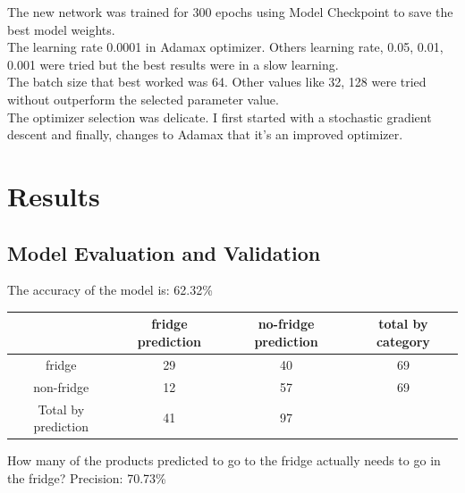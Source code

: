 \documentclass[a4paper,10pt]{article}
\begin{document}

The new network was trained for 300 epochs using Model Checkpoint to save the best model weights. \\

The learning rate 0.0001 in Adamax optimizer. Others learning rate, 0.05, 0.01, 0.001 were tried but the best results were in a slow learning. \\

The batch size that best worked was 64. Other values like 32, 128 were tried without outperform the selected parameter value.\\

The optimizer selection was delicate. I first started with a stochastic gradient descent and finally, changes to Adamax that it's an improved optimizer. \\

\section{Results}

\subsection{Model Evaluation and Validation}


The accuracy of the model is: 62.32\%

\begin{center}
\begin{tabular}{ |c|c|c|c| } 
 \hline
       & fridge prediction & no-fridge prediction & total by category \\ 
 \hline
 fridge & 29 & 40 & 69 \\ 
 non-fridge & 12 & 57 & 69 \\ 
 \hline
 Total by prediction & 41 & 97 & \\ 
 \hline
 
\end{tabular}
\end{center}

How many of the products predicted to go to the fridge actually needs to go in the fridge?
Precision: 70.73\% \\
\end{document}
